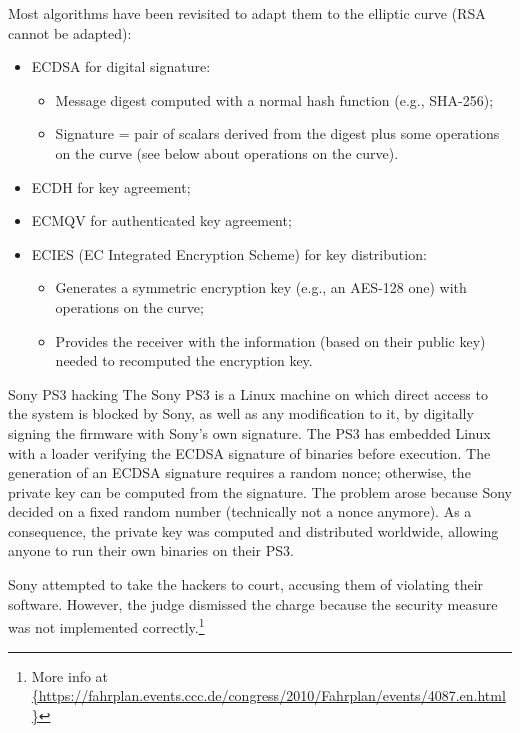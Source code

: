 Most algorithms have been revisited to adapt them to the elliptic curve (RSA cannot be adapted):
\begin{itemize}
    \item ECDSA for digital signature:
          \begin{itemize}
              \item Message digest computed with a normal hash function (e.g., SHA-256);
              \item Signature = pair of scalars derived from the digest plus some operations on the curve (see below about operations on the curve).
          \end{itemize}
    \item ECDH for key agreement;
    \item ECMQV for authenticated key agreement;
    \item ECIES (EC Integrated Encryption Scheme) for key distribution:
          \begin{itemize}
              \item Generates a symmetric encryption key (e.g., an AES-128 one) with operations on the curve;
              \item Provides the receiver with the information (based on their public key) needed to recomputed the encryption key.
          \end{itemize}
\end{itemize}


\begin{casehistory}{Sony PS3 hacking}
    The Sony PS3 is a Linux machine on which direct access to the system is blocked by Sony, as well as any modification to it, by digitally signing the firmware with Sony's own signature. The PS3 has embedded Linux with a loader verifying the ECDSA signature of binaries before execution. The generation of an ECDSA signature requires a random nonce; otherwise, the private key can be computed from the signature. The problem arose because Sony decided on a fixed random number (technically not a nonce anymore). As a consequence, the private key was computed and distributed worldwide, allowing anyone to run their own binaries on their PS3.

    Sony attempted to take the hackers to court, accusing them of violating their software. However, the judge dismissed the charge because the security measure was not implemented correctly.\footnote{More info at \url{{https://fahrplan.events.ccc.de/congress/2010/Fahrplan/events/4087.en.html}}}
\end{casehistory}


